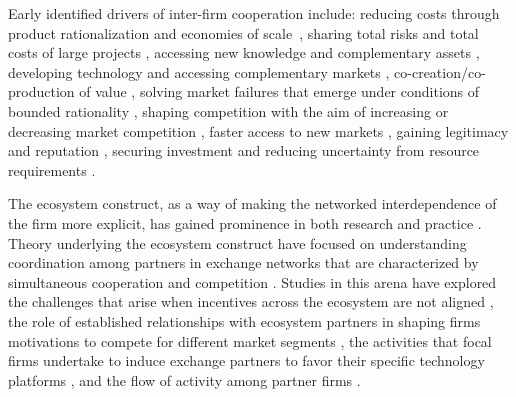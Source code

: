 \documentclass[CHICAGO,Times1COL]{WileyNJDv5} %
\renewcommand{\footnote}{\endnote}
\begin{document}
Early identified drivers of inter-firm cooperation include:
reducing costs through product rationalization and economies of scale~\citep{mariti1983co,contractor1992competition}, %
sharing total risks and total costs of large projects \citep{harrigan1984joint,baldi2012options},
accessing new knowledge and complementary assets \citep{kogut1988joint,teece1992competition},
developing  technology and accessing complementary  markets \citep{cravens_et_al_1996},
co-creation/co-production of value \citep{chan1997strategic,ramirez1999value}, %
solving market failures that emerge under conditions of bounded rationality \citep{williamson1985economic,williamson1991comparative},
shaping competition with the aim of increasing or decreasing market competition \citep{fuller_and_porter_1986coalitions,garud_and_kumaraswamy1993changing},
faster access to new markets \citep{contractor_and_lorgange_1988should,hung2003taxonomy},
gaining legitimacy and reputation \citep{dimaggio2000iron,greenwood2008influencing}, %
securing investment \citep{guiso2004role,stam2008entrepreneurial} and reducing uncertainty from resource requirements \citep{pfeffer_and_salancik_2003external}.
 
 The ecosystem construct, as a way of making the networked interdependence of the firm more explicit, has gained prominence in both  research
  and practice \citep{moore1999death,iansiti2004keystone,adner2006match}.
%
%
Theory underlying the ecosystem construct have focused on understanding coordination among partners in exchange
networks that are characterized by simultaneous
cooperation and competition \citep{afuah2000,brandenburger_and_nalebuff2011co}. Studies in this arena have explored the challenges that arise when incentives
across the ecosystem are not aligned \citep{casadesus2007wintel}, the role of established relationships with ecosystem partners in shaping firms motivations to compete for different
market segments \citep{Christensen1995}, the activities that focal firms undertake to induce exchange partners to favor their specific technology platforms \citep{gawer_and_cusunamo2002platform},  and the flow of activity among partner firms \citep{adner2010value}.
\end{document}
